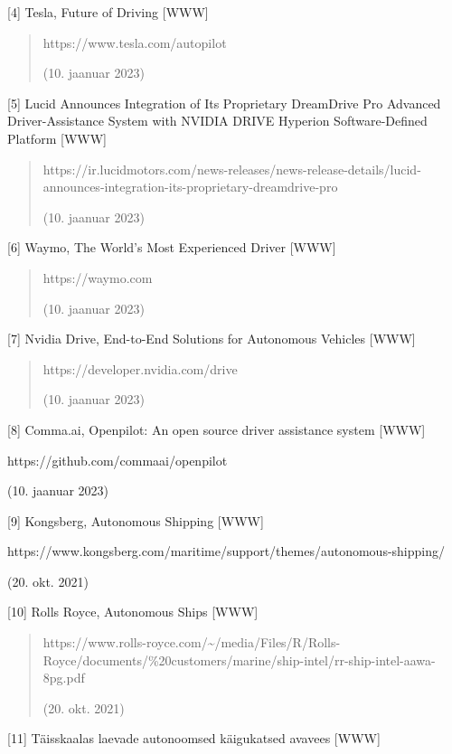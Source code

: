 \documentclass[12pt,a4paper]{report}
\begin{document}
{[}4{]} Tesla, Future of Driving {[}WWW{]}

\begin{quote}
https://www.tesla.com/autopilot

(10. jaanuar 2023)
\end{quote}

{[}5{]} Lucid Announces Integration of Its Proprietary DreamDrive Pro Advanced Driver-Assistance System with NVIDIA DRIVE Hyperion Software-Defined Platform {[}WWW{]}

\begin{quote}
https://ir.lucidmotors.com/news-releases/news-release-details/lucid-announces-integration-its-proprietary-dreamdrive-pro

(10. jaanuar 2023)
\end{quote}

{[}6{]} Waymo, The World's Most Experienced Driver {[}WWW{]}

\begin{quote}
https://waymo.com

(10. jaanuar 2023)
\end{quote}

{[}7{]} Nvidia Drive, End-to-End Solutions for Autonomous Vehicles {[}WWW{]}

\begin{quote}
https://developer.nvidia.com/drive

(10. jaanuar 2023)
\end{quote}

{[}8{]} Comma.ai, Openpilot: An open source driver assistance system {[}WWW{]}

https://github.com/commaai/openpilot

(10. jaanuar 2023)

{[}9{]} Kongsberg, Autonomous Shipping {[}WWW{]}

https://www.kongsberg.com/maritime/support/themes/autonomous-shipping/

(20. okt. 2021)

{[}10{]} Rolls Royce, Autonomous Ships {[}WWW{]}

\begin{quote}
https://www.rolls-royce.com/\textasciitilde/media/Files/R/Rolls-Royce/documents/\%20customers/marine/ship-intel/rr-ship-intel-aawa-8pg.pdf

(20. okt. 2021)
\end{quote}

{[}11{]} Täisskaalas laevade autonoomsed käigukatsed avavees {[}WWW{]}
\end{document}
